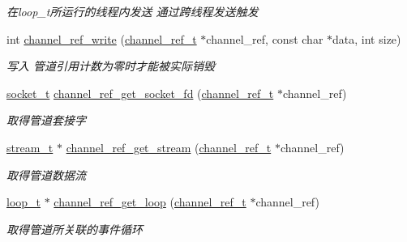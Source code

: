 \begin{DoxyCompactItemize}
\begin{DoxyCompactList}\small\item\em 在loop\+\_\+t所运行的线程内发送 通过跨线程发送触发 \end{DoxyCompactList}\item 
int \hyperlink{a00047_a0688f00d64ff34ae18fd4a354d890029_a0688f00d64ff34ae18fd4a354d890029}{channel\+\_\+ref\+\_\+write} (\hyperlink{a00050_a151271c9d188ef28d4d24bb81dcc1263_a151271c9d188ef28d4d24bb81dcc1263}{channel\+\_\+ref\+\_\+t} $\ast$channel\+\_\+ref, const char $\ast$data, int size)
\begin{DoxyCompactList}\small\item\em 写入 管道引用计数为零时才能被实际销毁 \end{DoxyCompactList}\item 
\hyperlink{a00050_a0d9e0afbf02fb6ed6c5b1415dce51b05_a0d9e0afbf02fb6ed6c5b1415dce51b05}{socket\+\_\+t} \hyperlink{a00101_gaf0c977ef05b7e767a8ef166a8037ec8b_gaf0c977ef05b7e767a8ef166a8037ec8b}{channel\+\_\+ref\+\_\+get\+\_\+socket\+\_\+fd} (\hyperlink{a00050_a151271c9d188ef28d4d24bb81dcc1263_a151271c9d188ef28d4d24bb81dcc1263}{channel\+\_\+ref\+\_\+t} $\ast$channel\+\_\+ref)
\begin{DoxyCompactList}\small\item\em 取得管道套接字 \end{DoxyCompactList}\item 
\hyperlink{a00050_a261dba04f46f5c59a68a05f69f5a65a8_a261dba04f46f5c59a68a05f69f5a65a8}{stream\+\_\+t} $\ast$ \hyperlink{a00101_gaf8d2758e1e063e04512049c9a9869d5e_gaf8d2758e1e063e04512049c9a9869d5e}{channel\+\_\+ref\+\_\+get\+\_\+stream} (\hyperlink{a00050_a151271c9d188ef28d4d24bb81dcc1263_a151271c9d188ef28d4d24bb81dcc1263}{channel\+\_\+ref\+\_\+t} $\ast$channel\+\_\+ref)
\begin{DoxyCompactList}\small\item\em 取得管道数据流 \end{DoxyCompactList}\item 
\hyperlink{a00050_a9c3ad1cd2de83e09f3a7b59fa82c94ee_a9c3ad1cd2de83e09f3a7b59fa82c94ee}{loop\+\_\+t} $\ast$ \hyperlink{a00101_gad840fd786ca7092d528a8fc45c2e2a76_gad840fd786ca7092d528a8fc45c2e2a76}{channel\+\_\+ref\+\_\+get\+\_\+loop} (\hyperlink{a00050_a151271c9d188ef28d4d24bb81dcc1263_a151271c9d188ef28d4d24bb81dcc1263}{channel\+\_\+ref\+\_\+t} $\ast$channel\+\_\+ref)
\begin{DoxyCompactList}\small\item\em 取得管道所关联的事件循环 \end{DoxyCompactList}\item 

\end{DoxyCompactItemize}
